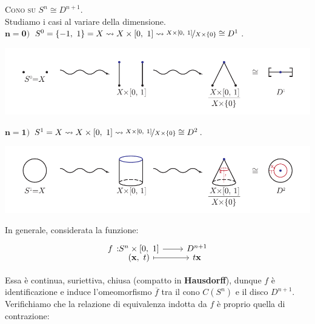 \begin{example} \textsc{Cono su} $S^n \cong D^{n+1}$.\\
	Studiamo i casi al variare della dimensione.\\
	$\mathbf{n=0)}$ $S^0=\{-1, \ 1\}=X \rightsquigarrow X\times\left[0,\ 1\right] \rightsquigarrow \nicefrac{X\times\left[0,\ 1\right]}{X\times \{0\}} \cong D^1$.
\begin{center}
	\includegraphics[trim=0cm 0cm 0cm 0cm,clip,scale=0.9]{images/cones0.pdf}
\end{center}
\vspace{-3mm}
	$\mathbf{n=1)}$ $S^1=X \rightsquigarrow X\times\left[0,\ 1\right] \rightsquigarrow \nicefrac{X\times\left[0,\ 1\right]}{X\times \{0\}} \cong D^2$.
\begin{center}
	\includegraphics[trim=0cm 0cm 0cm 0cm,clip,scale=0.9]{images/cones1.pdf}
\end{center}
\vspace{-3mm}
	In generale, considerata la funzione:
	\begin{equation*}
		\funztot f {S^n\times\intv} {D^{n+1}} {(\mathbf{x}, \ t)} {t\mathbf{x}}
	\end{equation*}
\begin{minipage}[t]{0.72\textwidth}
	Essa è continua, suriettiva, chiusa (compatto in \textbf{Hausdorff}), dunque $f$ è identificazione e induce l'omeomorfismo $\overline{f}$ tra il cono $C\left(S^n\right)$ e il disco $D^{n+1}$.
Verifichiamo che la relazione di equivalenza indotta da $f$ è proprio quella di contrazione:
\end{minipage}
\begin{minipage}[t]{0.29\textwidth}\vspace{-10pt}
\end{minipage}
\end{example}
